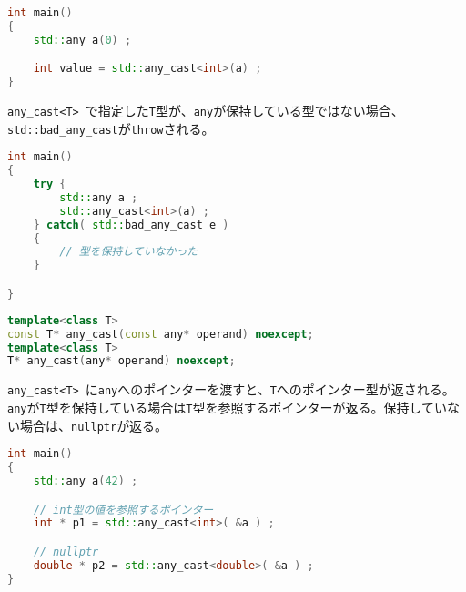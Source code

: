 \begin{lstlisting}[language=C++]
int main()
{
    std::any a(0) ;

    int value = std::any_cast<int>(a) ;
}
\end{lstlisting}

\lstinline!any_cast<T>!~で指定した\lstinline!T!型が、\lstinline!any!が保持している型ではない場合、\lstinline!std::bad_any_cast!が\lstinline!throw!される。

\begin{lstlisting}[language=C++]
int main()
{
    try {
        std::any a ;
        std::any_cast<int>(a) ;
    } catch( std::bad_any_cast e )
    {
        // 型を保持していなかった
    }

}
\end{lstlisting}

\begin{lstlisting}[language=C++]
template<class T>
const T* any_cast(const any* operand) noexcept;
template<class T>
T* any_cast(any* operand) noexcept;
\end{lstlisting}

\lstinline!any_cast<T>!~に\lstinline!any!へのポインターを渡すと、\lstinline!T!へのポインター型が返される。\lstinline!any!が\lstinline!T!型を保持している場合は\lstinline!T!型を参照するポインターが返る。保持していない場合は、\lstinline!nullptr!が返る。

\begin{lstlisting}[language=C++]
int main()
{
    std::any a(42) ;

    // int型の値を参照するポインター
    int * p1 = std::any_cast<int>( &a ) ;

    // nullptr
    double * p2 = std::any_cast<double>( &a ) ;
}
\end{lstlisting}

